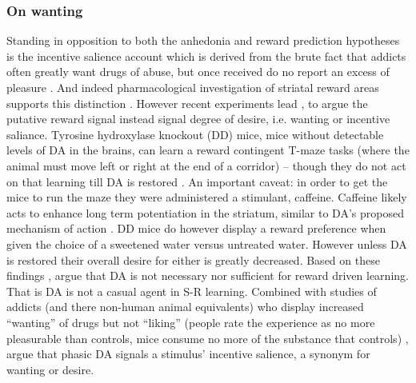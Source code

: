 \documentclass[doc,12pt]{apa}        %
\begin{document}
\subsubsection{On wanting}
\label{salience}
Standing in opposition to both the anhedonia and reward prediction hypotheses is the incentive salience account which is derived from the brute fact that addicts often greatly want drugs of abuse, but once received do no report an excess of pleasure \cite{Robinson:1993p8987}.  And indeed pharmacological investigation of striatal reward areas supports this distinction \cite{Berridge:2003p8998}.  However recent experiments lead , to argue the putative reward signal instead signal degree of desire, i.e. wanting or incentive saliance.  Tyrosine hydroxylase knockout (DD) mice, mice without detectable levels of DA in the brains, can learn a reward contingent T-maze tasks (where the animal must move left or right at the end of a corridor) -- though they do not act on that learning till DA is restored \cite{Berridge:2007p7235}.  An important caveat: in order to get the mice to run the maze they were administered a stimulant, caffeine.  Caffeine likely acts to enhance long term potentiation in the striatum, similar to DA's proposed mechanism of action \cite{Rossi:2010p7252}.  DD mice do however display a reward preference when given the choice of a sweetened water versus untreated water. However unless DA is restored their overall desire for either is greatly decreased.  Based on these findings , argue that DA is not necessary nor sufficient for reward driven learning.  That is DA is not a casual agent in S-R learning.  Combined with studies of addicts (and there non-human animal equivalents) who display increased ``wanting'' of drugs but not ``liking'' (people rate the experience as no more pleasurable than controls, mice consume no more of the substance that controls) , argue that phasic DA signals a stimulus' incentive salience, a synonym for wanting or desire.  
\end{document}
